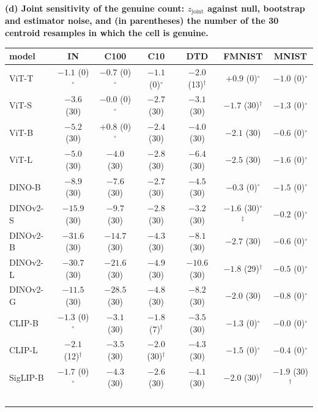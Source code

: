 \begin{table}[H]
\begin{tabular}{l|ccc|ccc|ccc}
\bottomrule
\end{tabular}
\par\vspace{5pt}
\endgroup
\begingroup
\noindent\textbf{(d) Joint sensitivity of the genuine count: $z_{\text{joint}}$ against null, bootstrap and estimator noise, and (in parentheses) the number of the 30 centroid resamples in which the cell is genuine.}\par\vspace{1.5pt}
\setlength{\tabcolsep}{2.6pt}
\begin{tabular}{lcccccc}
\toprule
model & IN & C100 & C10 & DTD & FMNIST & MNIST \\
\midrule
ViT-T & $-1.1$ (0)$^{\circ}$ & $-0.7$ (0)$^{\circ}$ & $-1.1$ (0)$^{\circ}$ & $-2.0$ (13)$^{\dagger}$ & $+0.9$ (0)$^{\circ}$ & $-1.0$ (0)$^{\circ}$ \\
ViT-S & $-3.6$ (30) & $-0.0$ (0)$^{\circ}$ & $-2.7$ (30) & $-3.1$ (30) & $-1.7$ (30)$^{\dagger}$ & $-1.3$ (0)$^{\circ}$ \\
ViT-B & $-5.2$ (30) & $+0.8$ (0)$^{\circ}$ & $-2.4$ (30) & $-4.0$ (30) & $-2.1$ (30) & $-0.6$ (0)$^{\circ}$ \\
ViT-L & $-5.0$ (30) & $-4.0$ (30) & $-2.8$ (30) & $-6.4$ (30) & $-2.5$ (30) & $-1.6$ (0)$^{\circ}$ \\
\midrule
DINO-B & $-8.9$ (30) & $-7.6$ (30) & $-2.7$ (30) & $-4.5$ (30) & $-0.3$ (0)$^{\circ}$ & $-1.5$ (0)$^{\circ}$ \\
DINOv2-S & $-15.9$ (30) & $-9.7$ (30) & $-2.8$ (30) & $-3.2$ (30) & $-1.6$ (30)$^{\circ}$$^{\ddagger}$ & $-0.2$ (0)$^{\circ}$ \\
DINOv2-B & $-31.6$ (30) & $-14.7$ (30) & $-4.3$ (30) & $-8.1$ (30) & $-2.7$ (30) & $-0.6$ (0)$^{\circ}$ \\
DINOv2-L & $-30.7$ (30) & $-21.6$ (30) & $-4.9$ (30) & $-10.6$ (30) & $-1.8$ (29)$^{\dagger}$ & $-0.5$ (0)$^{\circ}$ \\
DINOv2-G & $-11.5$ (30) & $-28.5$ (30) & $-4.8$ (30) & $-8.2$ (30) & $-2.0$ (30) & $-0.8$ (0)$^{\circ}$ \\
\midrule
CLIP-B & $-1.3$ (0)$^{\circ}$ & $-3.1$ (30) & $-1.8$ (7)$^{\dagger}$ & $-3.5$ (30) & $-1.3$ (0)$^{\circ}$ & $-0.0$ (0)$^{\circ}$ \\
CLIP-L & $-2.1$ (12)$^{\dagger}$ & $-3.5$ (30) & $-2.0$ (30)$^{\dagger}$ & $-4.3$ (30) & $-1.5$ (0)$^{\circ}$ & $-0.4$ (0)$^{\circ}$ \\
SigLIP-B & $-1.7$ (0)$^{\circ}$ & $-4.3$ (30) & $-2.6$ (30) & $-4.1$ (30) & $-2.0$ (30)$^{\dagger}$ & $-1.9$ (30)$^{\dagger}$ \\
$$
\end{tabular}
\end{table}
